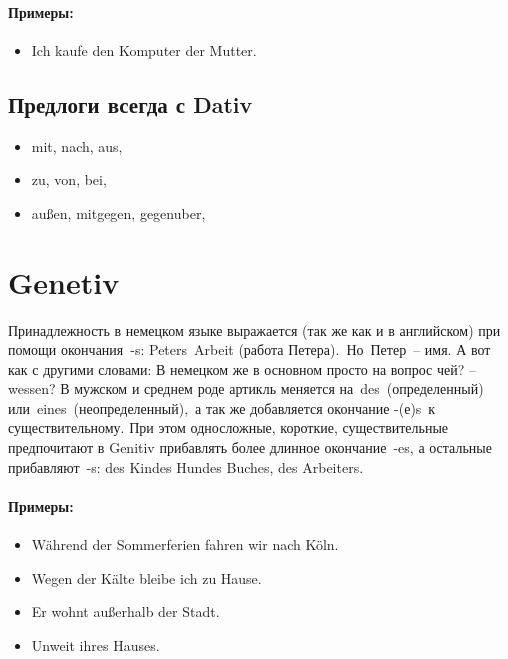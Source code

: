 \paragraph{Примеры:}

\begin{itemize}
\item Ich kaufe den Komputer der Mutter.
~\\ 
\end{itemize}

\subsection{Предлоги всегда с Dativ}

\begin{itemize}
\item mit, nach, aus,
\item zu, von, bei,
\item außen, mitgegen, gegenuber,
\end{itemize}

\section{Genetiv}

Принадлежность в немецком языке выражается (так же как и в английском) при помощи окончания -s: Peters Arbeit (работа Петера). Но Петер – имя. А вот как с другими словами: В немецком же в основном просто на вопрос чей? – wessen?
В мужском и среднем роде артикль меняется на des (определенный) или eines (неопределенный), а так же добавляется окончание -(е)s к существительному. При этом односложные, короткие, существительные предпочитают в Genitiv прибавлять более длинное окончание -es, а остальные прибавляют -s: des Kindes Hundes Buches, des Arbeiters.

\paragraph{Примеры:}

\begin{itemize}
\item Während der Sommerferien fahren wir nach Köln.
~\\ 
\item Wegen der Kälte bleibe ich zu Hause.
~\\ 
\item Er wohnt außerhalb der Stadt.
~\\ 
\item Unweit ihres Hauses.
~\\ 
\end{itemize}

